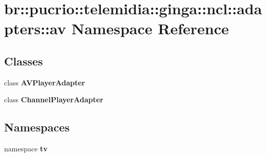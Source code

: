 \section{br::pucrio::telemidia::ginga::ncl::adapters::av Namespace Reference}
\label{namespacebr_1_1pucrio_1_1telemidia_1_1ginga_1_1ncl_1_1adapters_1_1av}


\subsection*{Classes}
\begin{CompactItemize}
\item 
class {\bf AVPlayerAdapter}
\item 
class {\bf ChannelPlayerAdapter}
\end{CompactItemize}
\subsection*{Namespaces}
\begin{CompactItemize}
\item 
namespace {\bf tv}
\end{CompactItemize}
